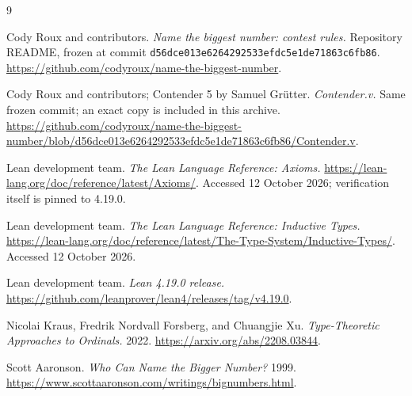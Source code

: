 \clearpage
\begin{thebibliography}{9}
\raggedright
{}
Cody Roux and contributors.
\emph{Name the biggest number: contest rules.}
Repository README, frozen at commit
\texttt{d56dce013e6264292533efdc5e1de71863c6fb86}.
\url{https://github.com/codyroux/name-the-biggest-number}.

Cody Roux and contributors; Contender 5 by Samuel Gr\"utter.
\emph{Contender.v.}
Same frozen commit; an exact copy is included in this archive.
\url{https://github.com/codyroux/name-the-biggest-number/blob/d56dce013e6264292533efdc5e1de71863c6fb86/Contender.v}.

Lean development team.
\emph{The Lean Language Reference: Axioms.}
\url{https://lean-lang.org/doc/reference/latest/Axioms/}.
Accessed 12 October 2026; verification itself is pinned to 4.19.0.

Lean development team.
\emph{The Lean Language Reference: Inductive Types.}
\url{https://lean-lang.org/doc/reference/latest/The-Type-System/Inductive-Types/}.
Accessed 12 October 2026.

Lean development team.
\emph{Lean 4.19.0 release.}
\url{https://github.com/leanprover/lean4/releases/tag/v4.19.0}.

Nicolai Kraus, Fredrik Nordvall Forsberg, and Chuangjie Xu.
\emph{Type-Theoretic Approaches to Ordinals.}
2022. \url{https://arxiv.org/abs/2208.03844}.

Scott Aaronson.
\emph{Who Can Name the Bigger Number?}
1999. \url{https://www.scottaaronson.com/writings/bignumbers.html}.
\end{thebibliography}

